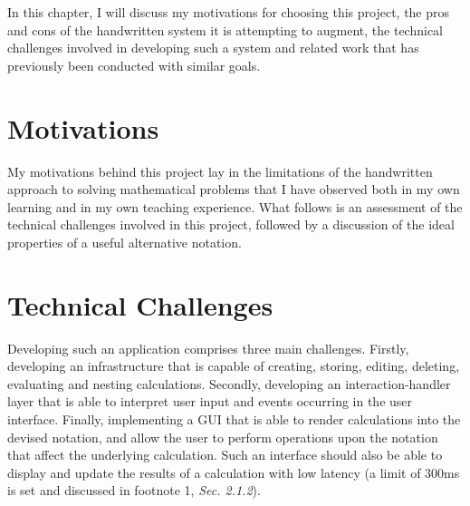 \documentclass[12pt,twoside,notitlepage,xetex]{report}
\begin{document}
In this chapter, I will discuss my motivations for choosing this project, the pros and cons of the handwritten system it is attempting to augment, the technical challenges involved in developing such a system and related work that has previously been conducted with similar goals.

\section{Motivations}

My motivations behind this project lay in the limitations of the handwritten approach to solving mathematical problems that I have observed both in my own learning and in my own teaching experience.  What follows is an assessment of the technical challenges involved in this project, followed by a discussion of the ideal properties of a useful alternative notation.

\pagebreak



\section{Technical Challenges}

Developing such an application comprises three main challenges.  Firstly, developing an infrastructure that is capable of creating, storing, editing, deleting, evaluating and nesting calculations.  Secondly, developing an interaction-handler layer that is able to interpret user input and events occurring in the user interface.  Finally, implementing a GUI that is able to render calculations into the devised notation, and allow the user to perform operations upon the notation that affect the underlying calculation.  Such an interface should also be able to display and update the results of a calculation with low latency (a limit of 300ms is set and discussed in footnote 1, \emph{Sec. 2.1.2}).
\end{document}

